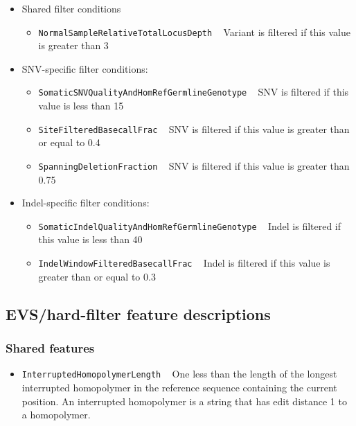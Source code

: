 \documentclass{article}
\begin{document}
\begin{itemize}
    \item Shared filter conditions
    \begin{itemize}
        \item \texttt{NormalSampleRelativeTotalLocusDepth} ~ Variant is filtered if this value is greater than 3
    \end{itemize}
    \item SNV-specific filter conditions:
    \begin{itemize}
        \item \texttt{SomaticSNVQualityAndHomRefGermlineGenotype} ~ SNV is filtered if this value is less than 15
        \item \texttt{SiteFilteredBasecallFrac} ~ SNV is filtered if this value is greater than or equal to 0.4
        \item \texttt{SpanningDeletionFraction} ~ SNV is filtered if this value is greater than 0.75
    \end{itemize}
    \item Indel-specific filter conditions:
    \begin{itemize}
        \item \texttt{SomaticIndelQualityAndHomRefGermlineGenotype} ~ Indel is filtered if this value is less than 40
        \item \texttt{IndelWindowFilteredBasecallFrac} ~ Indel is filtered if this value is greater than or equal to 0.3
    \end{itemize}
\end{itemize}


\subsection{EVS/hard-filter feature descriptions}
\label{sec:ScoringFeatures}

\subsubsection{Shared features}
\begin{itemize}

    \item \texttt{InterruptedHomopolymerLength} ~ One less than the length of the longest interrupted homopolymer in the reference sequence containing the current position. An interrupted homopolymer is a string that has edit distance 1 to a homopolymer.

\end{itemize}
\end{document}

